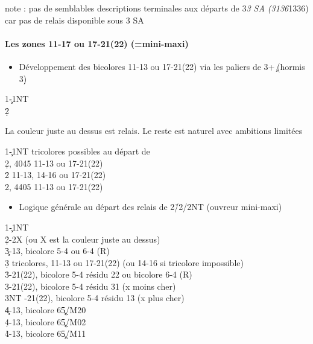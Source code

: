 \documentclass[a4paper]{article}
\begin{document}
note :	pas de semblables descriptions terminales aux départs de 3\s \emph{3 SA (3136}1336)
car pas de relais disponible sous 3 SA

\paragraph{Les zones 11-17 ou 17-21(22) (=mini-maxi)}

\begin{itemize}
\item Développement des bicolores 11-13 ou 17-21(22) via les paliers de 3+\c\ (hormis 3\d )

\end{itemize}

\begin{bidtable}
1\c-1NT\\
2\d\h\s
\end{bidtable}

La couleur juste au dessus est relais.
Le reste est naturel avec ambitions limitées

\begin{bidtable}
1\c-1NT \> tricolores possibles au départ de\\
2\d {}, 4045 11-13 ou 17-21(22)\\
2\h {} 11-13, 14-16 ou 17-21(22)\\
2\s {}, 4405 11-13 ou 17-21(22)
\end{bidtable}

\begin{itemize}
\item Logique générale au départ des relais de 2\h /2\s /2NT (ouvreur mini-maxi)

\end{itemize}

\begin{bidtable}
1\c-1NT\\
2\d\h\s-2X \> (ou X est la couleur juste au dessus)\\
3\c {}-13, bicolore 5-4 ou 6-4 (R)\\
3\d \> tricolores, 11-13 ou 17-21(22) (ou 14-16 si tricolore impossible)\\
3\h {}-21(22), bicolore 5-4 résidu 22 ou bicolore 6-4 (R)\\
3\s {}-21(22), bicolore 5-4 résidu 31  (x moins cher)\\
3NT -21(22), bicolore 5-4 résidu 13  (x plus cher)\\
4\c {}-13, bicolore 6\c 5\d /M20\\
4\d {}-13, bicolore 6\c 5\d /M02\\
4\h {}-13, bicolore 6\c 5\d /M11
\end{bidtable}
\end{document}
